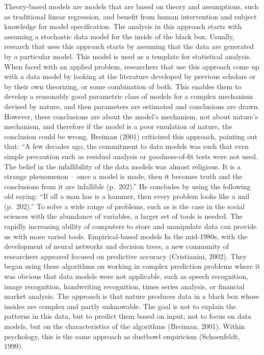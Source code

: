 \documentclass[
  man]{apa6}
\begin{document}
Theory-based models are models that are based on theory and assumptions, such as traditional linear regression, and benefit from human intervention and subject knowledge for model specification. The analysis in this approach starts with assuming a stochastic data model for the inside of the black box. Usually, research that uses this approach starts by assuming that the data are generated by a particular model. This model is used as a template for statistical analysis. When faced with an applied problem, researchers that use this approach come up with a data model by looking at the literature developed by previous scholars or by their own theorizing, or some combination of both. This enables them to develop a reasonably good parametric class of models for a complex mechanism devised by nature, and then parameters are estimated and conclusions are drawn. However, these conclusions are about the model's mechanism, not about nature's mechanism, and therefore if the model is a poor emulation of nature, the conclusion could be wrong.
Breiman (2001) criticized this approach, pointing out that:
``A few decades ago, the commitment to data models was such that even simple precaution such as residual analysis or goodness-of-fit tests were not used. The belief in the infallibility of the data models was almost religious. It is a strange phenomenon -- once a model is made, then it becomes truth and the conclusions from it are infallible (p.~202).''
He concludes by using the following old saying: ``If all a man has is a hammer, then every problem looks like a nail (p.~202).''
To solve a wide range of problems, such as is the case in the social sciences with the abundance of variables, a larger set of tools is needed. The rapidly increasing ability of computers to store and manipulate data can provide us with more varied tools.
Empirical-based models
In the mid-1980s, with the development of neural networks and decision trees, a new community of researchers appeared focused on predictive accuracy (Cristianini, 2002). They began using these algorithms on working in complex prediction problems where it was obvious that data models were not applicable, such as speech recognition, image recognition, handwriting recognition, times series analysis, or financial market analysis. The approach is that nature produces data in a black box whose insides are complex and partly unknowable. The goal is not to explain the patterns in this data, but to predict them based on input; not to focus on data models, but on the characteristics of the algorithms (Breiman, 2001). Within psychology, this is the same approach as dustbowl empiricism (Schoenfeldt, 1999).
\end{document}
